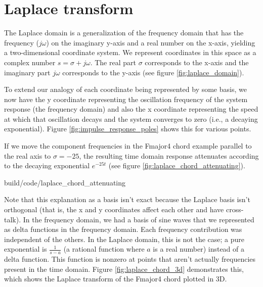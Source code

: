 \section{Laplace transform}

The Laplace domain is a generalization of the frequency domain that has the
frequency ($j\omega$) on the imaginary y-axis and a real number on the x-axis,
yielding a two-dimensional coordinate system. We represent coordinates in this
space as a complex number $s = \sigma + j\omega$. The real part $\sigma$
corresponds to the x-axis and the imaginary part $j\omega$ corresponds to the
y-axis (see figure \ref{fig:laplace_domain}).

\begin{bookfigure}

  \caption{Laplace domain}
  \label{fig:laplace_domain}
\end{bookfigure}

To extend our analogy of each coordinate being represented by some basis, we now
have the y coordinate representing the oscillation frequency of the
\gls{system response} (the frequency domain) and also the x coordinate
representing the speed at which that oscillation decays and the \gls{system}
converges to zero (i.e., a decaying exponential). Figure
\ref{fig:impulse_response_poles} shows this for various points.

If we move the component frequencies in the Fmajor4 chord example parallel to
the real axis to $\sigma = -25$, the resulting time domain response attenuates
according to the decaying exponential $e^{-25t}$ (see figure
\ref{fig:laplace_chord_attenuating}).

\begin{svg}{build/code/laplace_chord_attenuating}
  \caption{Fmajor4 chord at $\sigma = 0$ and $\sigma = -25$}
  \label{fig:laplace_chord_attenuating}
\end{svg}

Note that this explanation as a basis isn't exact because the Laplace basis
isn't orthogonal (that is, the x and y coordinates affect each other and have
cross-talk). In the frequency domain, we had a basis of sine waves that we
represented as delta functions in the frequency domain. Each frequency
contribution was independent of the others. In the Laplace domain, this is not
the case; a pure exponential is $\frac{1}{s - a}$ (a rational function where $a$
is a real number) instead of a delta function. This function is nonzero at
points that aren't actually frequencies present in the time domain. Figure
\ref{fig:laplace_chord_3d} demonstrates this, which shows the Laplace transform
of the Fmajor4 chord plotted in 3D.

